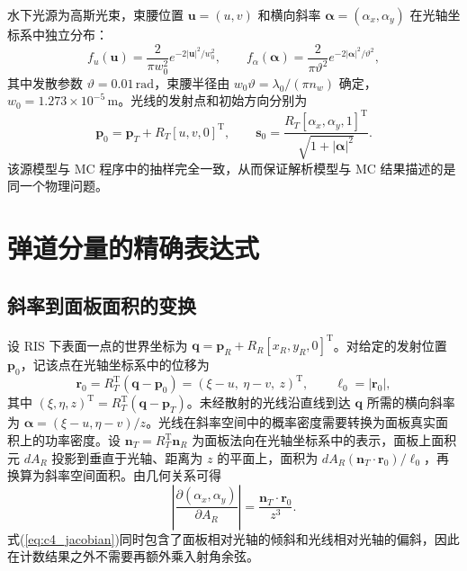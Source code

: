水下光源为高斯光束，束腰位置 $\mathbf u=(u,v)$ 和横向斜率 $\boldsymbol\alpha=(\alpha_x,\alpha_y)$ 在光轴坐标系中独立分布：
\begin{equation}
f_u(\mathbf u)=\frac{2}{\pi w_0^2}e^{-2|\mathbf u|^2/w_0^2},\qquad
f_\alpha(\boldsymbol\alpha)=\frac{2}{\pi\vartheta^2}e^{-2|\boldsymbol\alpha|^2/\vartheta^2},
\label{eq:c4_source}
\end{equation}
其中发散参数 $\vartheta=0.01\,\mathrm{rad}$，束腰半径由 $w_0\vartheta=\lambda_0/(\pi n_w)$ 确定，$w_0=1.273\times10^{-5}\,\mathrm m$。光线的发射点和初始方向分别为
\begin{equation}
\mathbf p_0=\mathbf p_T+R_T[u,v,0]^{\mathrm T},\qquad
\mathbf s_0=\frac{R_T[\alpha_x,\alpha_y,1]^{\mathrm T}}{\sqrt{1+|\boldsymbol\alpha|^2}}.
\label{eq:c4_launch}
\end{equation}
该源模型与 MC 程序中的抽样完全一致，从而保证解析模型与 MC 结果描述的是同一个物理问题。

\section{弹道分量的精确表达式}
\label{sec:c4_ballistic}

\subsection{斜率到面板面积的变换}

设 RIS 下表面一点的世界坐标为 $\mathbf q=\mathbf p_R+R_R[x_R,y_R,0]^{\mathrm T}$。对给定的发射位置 $\mathbf p_0$，记该点在光轴坐标系中的位移为
\begin{equation}
\mathbf r_0=R_T^{\mathrm T}(\mathbf q-\mathbf p_0)=(\xi-u,\ \eta-v,\ z)^{\mathrm T},\qquad \ell_0=|\mathbf r_0|,
\label{eq:c4_r0}
\end{equation}
其中 $(\xi,\eta,z)^{\mathrm T}=R_T^{\mathrm T}(\mathbf q-\mathbf p_T)$。未经散射的光线沿直线到达 $\mathbf q$ 所需的横向斜率为 $\boldsymbol\alpha=(\xi-u,\eta-v)/z$。光线在斜率空间中的概率密度需要转换为面板真实面积上的功率密度。设 $\mathbf n_T=R_T^{\mathrm T}\mathbf n_R$ 为面板法向在光轴坐标系中的表示，面板上面积元 $dA_R$ 投影到垂直于光轴、距离为 $z$ 的平面上，面积为 $dA_R(\mathbf n_T\cdot\mathbf r_0)/\ell_0$，再换算为斜率空间面积。由几何关系可得
\begin{equation}
\left|\frac{\partial(\alpha_x,\alpha_y)}{\partial A_R}\right|=\frac{\mathbf n_T\cdot\mathbf r_0}{z^3}.
\label{eq:c4_jacobian}
\end{equation}
式(\ref{eq:c4_jacobian})同时包含了面板相对光轴的倾斜和光线相对光轴的偏斜，因此在计数结果之外不需要再额外乘入射角余弦。

